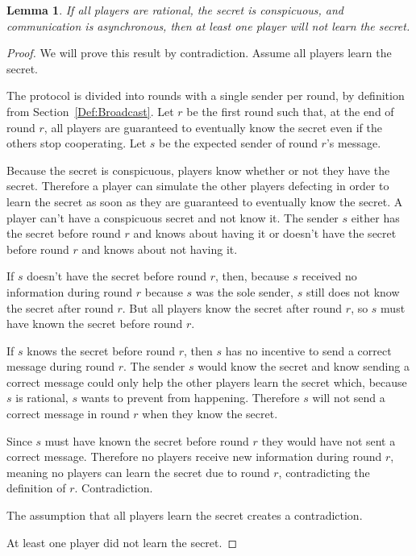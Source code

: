\documentclass[12pt]{dalcsthesis}
\newtheorem{lemma}{Lemma}
\begin{document}
\begin{lemma}\label{Lem:Async:ConspicuousMustSacrifice}If all players are rational, the secret is conspicuous, and communication is asynchronous, then at least one player will not learn the secret.\end{lemma}
\begin{proof}
We will prove this result by contradiction. Assume all players learn the secret.

The protocol is divided into rounds with a single sender per round, by definition from Section~\ref{Def:Broadcast}. Let $r$ be the first round such that, at the end of round $r$, all players are guaranteed to eventually know the secret even if the others stop cooperating. Let $s$ be the expected sender of round $r$'s message.

Because the secret is conspicuous, players know whether or not they have the secret. Therefore a player can simulate the other players defecting in order to learn the secret as soon as they are guaranteed to eventually know the secret. A player can't have a conspicuous secret and not know it. The sender $s$ either has the secret before round $r$ and knows about having it or doesn't have the secret before round $r$ and knows about not having it.

If $s$ doesn't have the secret before round $r$, then, because $s$ received no information during round $r$ because $s$ was the sole sender, $s$ still does not know the secret after round $r$. But all players know the secret after round $r$, so $s$ must have known the secret before round $r$.

If $s$ knows the secret before round $r$, then $s$ has no incentive to send a correct message during round $r$. The sender $s$ would know the secret and know sending a correct message could only help the other players learn the secret which, because $s$ is rational, $s$ wants to prevent from happening. Therefore $s$ will not send a correct message in round $r$ when they know the secret.

Since $s$ must have known the secret before round $r$ they would have not sent a correct message. Therefore no players receive new information during round $r$, meaning no players can learn the secret due to round $r$, contradicting the definition of $r$. Contradiction.

The assumption that all players learn the secret creates a contradiction.

At least one player did not learn the secret.
\end{proof}
\end{document}

